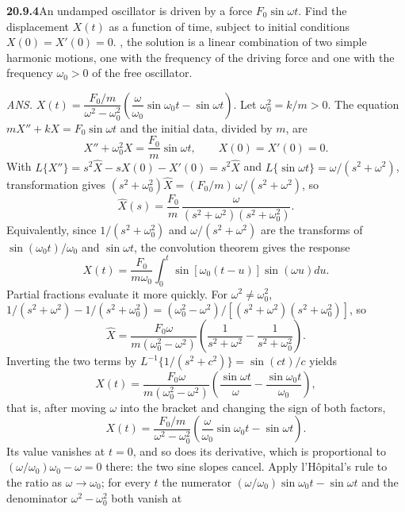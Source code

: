\par\bigskip
\noindent\textbf{20.9.4}\quad An undamped oscillator is driven by
a force $F_{0}\sin\omega t$. Find the displacement $X(t)$ as a
function of time, subject to initial conditions $X(0)=X'(0)=0$.
, the solution is a linear
combination of two simple harmonic motions, one with the frequency
of the driving force and one with the frequency $\omega_0>0$ of
the free oscillator. 
\par\nobreak\hfill\emph{ANS.}\enspace
$X(t)=\dfrac{F_{0}/m}{\omega^{2}-\omega_{0}^{2}}
\left(\dfrac{\omega}{\omega_{0}}\sin\omega_{0}t-\sin\omega t\right)$.
\solution
Let $\omega_0^2=k/m>0$. The equation $mX''+kX=F_0\sin\omega t$
and the initial data, divided by $m$, are
\[
X''+\omega_0^2X=\frac{F_0}m\sin\omega t,\qquad X(0)=X'(0)=0.
\]
With $L\{X''\}=s^2\widehat X-sX(0)-X'(0)=s^2\widehat X$ and
$L\{\sin\omega t\}=\omega/(s^2+\omega^2)$, transformation gives
$(s^2+\omega_0^2)\widehat X=(F_0/m)\,\omega/(s^2+\omega^2)$, so
\[
\widehat X(s)=\frac{F_0}m\,
\frac\omega{(s^2+\omega^2)(s^2+\omega_0^2)}.
\]
Equivalently, since $1/(s^2+\omega_0^2)$ and
$\omega/(s^2+\omega^2)$ are the transforms of
$\sin(\omega_0t)/\omega_0$ and $\sin\omega t$, the convolution
theorem gives the response
\[
X(t)=\frac{F_0}{m\omega_0}\int_0^t
\sin[\omega_0(t-u)]\sin(\omega u)du.
\]
Partial fractions evaluate it more quickly. For
$\omega^2\ne\omega_0^2$,
$1/(s^2+\omega^2)-1/(s^2+\omega_0^2)
=(\omega_0^2-\omega^2)/[(s^2+\omega^2)(s^2+\omega_0^2)]$, so
\[
\widehat X=\frac{F_0\omega}{m(\omega_0^2-\omega^2)}
\left(\frac1{s^2+\omega^2}-\frac1{s^2+\omega_0^2}\right).
\]
Inverting the two terms by $L^{-1}\{1/(s^2+c^2)\}=\sin(ct)/c$
yields
\[
X(t)=\frac{F_0\omega}{m(\omega_0^2-\omega^2)}
\left(\frac{\sin\omega t}{\omega}
-\frac{\sin\omega_0t}{\omega_0}\right),
\]
that is, after moving $\omega$ into the bracket and changing
the sign of both factors,
\[
\boxed{X(t)=\frac{F_0/m}{\omega^2-\omega_0^2}
\left(\frac\omega{\omega_0}\sin\omega_0t-\sin\omega t\right)}.
\]
Its value vanishes at $t=0$, and so does its derivative, which
is proportional to $(\omega/\omega_0)\omega_0-\omega=0$ there:
the two sine slopes cancel.
Apply l'H\^opital's rule to the ratio as $\omega\to\omega_0$;
for every $t$ the numerator
$(\omega/\omega_0)\sin\omega_0t-\sin\omega t$ and the
denominator $\omega^2-\omega_0^2$ both vanish at
